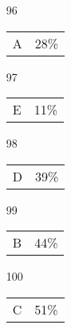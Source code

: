 \documentclass[12pt]{article}
\begin{document}
\begin{multicols}{5}
\begin{enumerate}
\item[]
\item[96] \begin{tabular}{cc} A & 28\%\end{tabular}
\item[97] \begin{tabular}{cc} E & 11\%\end{tabular}
\item[98] \begin{tabular}{cc} D & 39\%\end{tabular}
\item[99] \begin{tabular}{cc} B & 44\%\end{tabular}
\item[100] \begin{tabular}{cc} C & 51\%\end{tabular}

\item[]
\end{enumerate}
\end{multicols}
\clearpage
\end{document}
